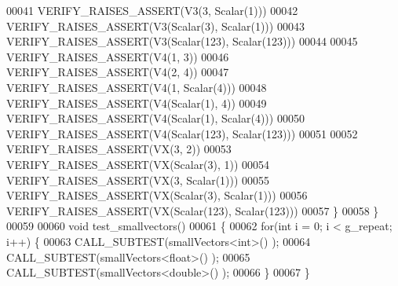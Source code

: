 \begin{DoxyCode}
00041     VERIFY\_RAISES\_ASSERT(V3(3, Scalar(1)))
00042     VERIFY\_RAISES\_ASSERT(V3(Scalar(3), Scalar(1)))
00043     VERIFY\_RAISES\_ASSERT(V3(Scalar(123), Scalar(123)))
00044 
00045     VERIFY\_RAISES\_ASSERT(V4(1, 3))
00046     VERIFY\_RAISES\_ASSERT(V4(2, 4))
00047     VERIFY\_RAISES\_ASSERT(V4(1, Scalar(4)))
00048     VERIFY\_RAISES\_ASSERT(V4(Scalar(1), 4))
00049     VERIFY\_RAISES\_ASSERT(V4(Scalar(1), Scalar(4)))
00050     VERIFY\_RAISES\_ASSERT(V4(Scalar(123), Scalar(123)))
00051 
00052     VERIFY\_RAISES\_ASSERT(VX(3, 2))
00053     VERIFY\_RAISES\_ASSERT(VX(Scalar(3), 1))
00054     VERIFY\_RAISES\_ASSERT(VX(3, Scalar(1)))
00055     VERIFY\_RAISES\_ASSERT(VX(Scalar(3), Scalar(1)))
00056     VERIFY\_RAISES\_ASSERT(VX(Scalar(123), Scalar(123)))
00057   \}
00058 \}
00059 
00060 \textcolor{keywordtype}{void} test\_smallvectors()
00061 \{
00062   \textcolor{keywordflow}{for}(\textcolor{keywordtype}{int} i = 0; i < g\_repeat; i++) \{
00063     CALL\_SUBTEST(smallVectors<int>() );
00064     CALL\_SUBTEST(smallVectors<float>() );
00065     CALL\_SUBTEST(smallVectors<double>() );
00066   \}
00067 \}
\end{DoxyCode}
